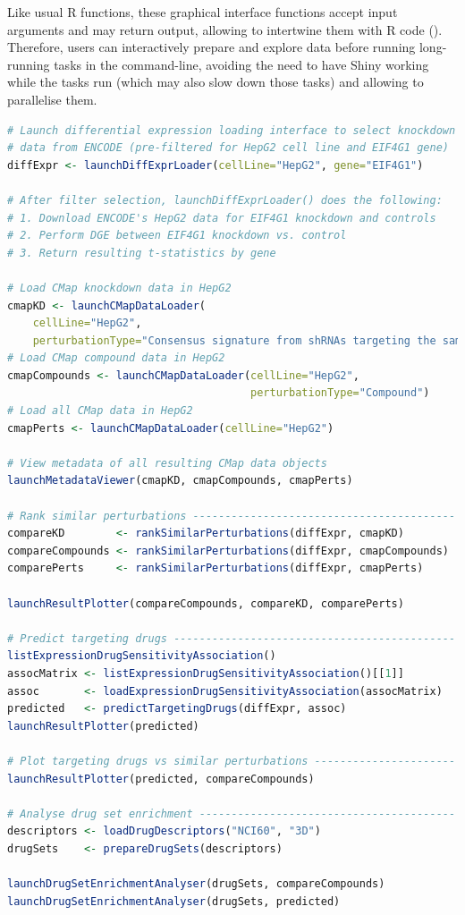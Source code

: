 Like usual R functions, these graphical interface functions accept input arguments and may return output, allowing to intertwine them with R code (). Therefore, users can interactively prepare and explore data before running long-running tasks in the command-line, avoiding the need to have Shiny working while the tasks run (which may also slow down those tasks) and allowing to parallelise them.

\begin{lstlisting}[caption=Calling cTRAP's graphical interface functions in an R script.,label={lst:cTRAP-graphical},language=R,morekeywords={include, launchDiffExprLoader},keywordstyle=\bfseries]
# Launch differential expression loading interface to select knockdown
# data from ENCODE (pre-filtered for HepG2 cell line and EIF4G1 gene)
diffExpr <- launchDiffExprLoader(cellLine="HepG2", gene="EIF4G1")

# After filter selection, launchDiffExprLoader() does the following:
# 1. Download ENCODE's HepG2 data for EIF4G1 knockdown and controls
# 2. Perform DGE between EIF4G1 knockdown vs. control
# 3. Return resulting t-statistics by gene

# Load CMap knockdown data in HepG2
cmapKD <- launchCMapDataLoader(
    cellLine="HepG2",
    perturbationType="Consensus signature from shRNAs targeting the same gene")
# Load CMap compound data in HepG2
cmapCompounds <- launchCMapDataLoader(cellLine="HepG2",
                                      perturbationType="Compound")
# Load all CMap data in HepG2
cmapPerts <- launchCMapDataLoader(cellLine="HepG2")

# View metadata of all resulting CMap data objects
launchMetadataViewer(cmapKD, cmapCompounds, cmapPerts)

# Rank similar perturbations -----------------------------------------
compareKD        <- rankSimilarPerturbations(diffExpr, cmapKD)
compareCompounds <- rankSimilarPerturbations(diffExpr, cmapCompounds)
comparePerts     <- rankSimilarPerturbations(diffExpr, cmapPerts)

launchResultPlotter(compareCompounds, compareKD, comparePerts)

# Predict targeting drugs --------------------------------------------
listExpressionDrugSensitivityAssociation()
assocMatrix <- listExpressionDrugSensitivityAssociation()[[1]]
assoc       <- loadExpressionDrugSensitivityAssociation(assocMatrix)
predicted   <- predictTargetingDrugs(diffExpr, assoc)
launchResultPlotter(predicted)

# Plot targeting drugs vs similar perturbations ----------------------
launchResultPlotter(predicted, compareCompounds)

# Analyse drug set enrichment ----------------------------------------
descriptors <- loadDrugDescriptors("NCI60", "3D")
drugSets    <- prepareDrugSets(descriptors)

launchDrugSetEnrichmentAnalyser(drugSets, compareCompounds)
launchDrugSetEnrichmentAnalyser(drugSets, predicted)
\end{lstlisting}

